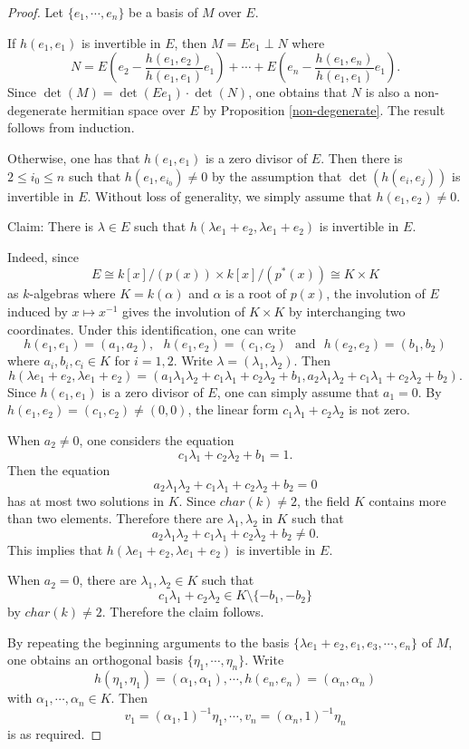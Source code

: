 \documentclass[10pt,a4paper]{amsart}
\begin{document}
\begin{proof} Let $\{ e_1, \cdots, e_n \}$ be a basis of $M$ over $E$. 

If $h(e_1, e_1)$ is invertible in $E$, then $M= E e_1 \perp N$ where 
$$ N= E(e_2- \frac{h(e_1, e_2)}{h(e_1, e_1)} e_1)+  \cdots + E(e_n- \frac{h(e_1, e_n)}{h(e_1, e_1)} e_1). $$
Since $\det (M) = \det (Ee_1) \cdot \det (N)$, one obtains that $N$ is also a non-degenerate hermitian space over $E$ by Proposition \ref{non-degenerate}. The result follows from induction.

Otherwise, one has that $h(e_1, e_1)$ is a zero divisor of $E$. Then there is $2\leq i_0\leq n$ such that $h(e_1, e_{i_0})\neq 0$ by the assumption that $\det (h(e_i, e_j))$ is invertible in $E$. Without loss of generality, we simply assume that $h(e_1, e_2)\neq 0$.  

Claim: There is $\lambda\in E$ such that $h(\lambda e_1+ e_2, \lambda e_1+  e_2)$ is invertible in $E$. 

Indeed, since 
$$ E\cong k[x]/(p(x)) \times k[x]/(p^*(x)) \cong K\times K $$
as $k$-algebras where $K=k(\alpha)$ and $\alpha$ is a root of $p(x)$, the involution of $E$ induced by $x\mapsto x^{-1}$ gives the involution of $K\times K$ by interchanging two coordinates.  Under this identification, one can write 
$$ h(e_1, e_1)= (a_1, a_2), \ \ \ h(e_1, e_2) = (c_1, c_2) \ \ \ \text{and} \ \ \ h(e_2, e_2) =(b_1, b_2)$$  
where $a_i, b_i, c_i\in K$ for $i=1, 2$.  Write $\lambda= (\lambda_1, \lambda_2)$. Then 
$$ h(\lambda e_1+ e_2, \lambda e_1+ e_2)=(a_1\lambda_1\lambda_2+c_1\lambda_1+c_2\lambda_2+b_1, a_2\lambda_1\lambda_2+ c_1\lambda_1+c_2\lambda_2+b_2).$$
Since $h(e_1, e_1)$ is a zero divisor of $E$, one can simply assume that $a_1=0$.  By $h(e_1, e_2)= (c_1, c_2)\neq (0, 0)$, the linear form $c_1\lambda_1+c_2\lambda_2$ is not zero. 

When $a_2\neq 0$, one considers the equation 
$$ c_1\lambda_1+c_2\lambda_2+b_1=1 .$$  Then the equation 
$$ a_2\lambda_1\lambda_2+ c_1\lambda_1+c_2\lambda_2+b_2=0 $$ has at most two solutions in $K$. Since $char(k)\neq 2$, the field $K$ contains more than two elements. Therefore there are $\lambda_1, \lambda_2$ in $K$ such that 
$$ a_2\lambda_1\lambda_2+ c_1\lambda_1+c_2\lambda_2+b_2 \neq 0 . $$ This implies that $h(\lambda e_1+ e_2, \lambda e_1+  e_2)$ is invertible in $E$. 


When $a_2=0$, there are $\lambda_1, \lambda_2\in K$ such that $$c_1\lambda_1+c_2\lambda_2 \in K\setminus \{-b_1, -b_2 \}$$ by $char(k)\neq 2$. Therefore the claim follows.

By repeating the beginning arguments to the basis $\{ \lambda e_1+ e_2, e_1, e_3, \cdots, e_n \}$ of $M$, one obtains an orthogonal basis $\{\eta_1, \cdots, \eta_n \}$. Write
$$ h(\eta_1, \eta_1)= (\alpha_1, \alpha_1), \cdots, h(e_n, e_n)=(\alpha_n, \alpha_n) $$ with $\alpha_1, \cdots, \alpha_n \in K$. Then 
$$ v_1= (\alpha_1, 1)^{-1} \eta_1, \cdots, v_n = (\alpha_n, 1)^{-1} \eta_n $$ is as required. 
\end{proof}
\end{document}
